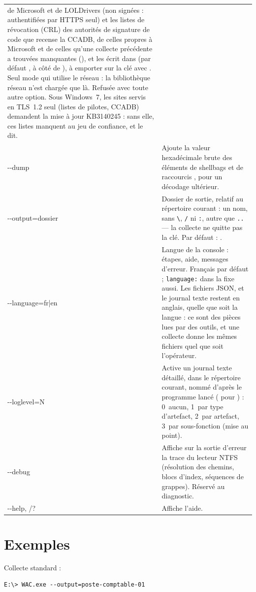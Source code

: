 \documentclass[11pt,a4paper,oneside]{report}
\begin{document}
\begin{longtable}{@{}>{\ttfamily}L{3.2cm}L{11.2cm}@{}}
  de Microsoft et de LOLDrivers (non signées : authentifiées par HTTPS seul)
  et les listes de révocation (CRL) des autorités de signature de code que
  recense la CCADB, de celles propres à Microsoft et de celles qu'une collecte
  précédente a trouvées manquantes (), et les écrit dans  (par
  défaut , à côté de ), à emporter sur la clé
  avec . Seul mode qui utilise le réseau : la bibliothèque
  réseau n'est chargée que là. Refusée avec toute autre option. Sous
  Windows~7, les sites servis en TLS~1.2 seul (listes de pilotes, CCADB)
  demandent la mise à jour KB3140245 : sans elle, ces listes manquent au jeu
  de confiance, et  le dit. \\
-{}-dump & Ajoute la valeur hexadécimale brute des éléments de shellbags et de
  raccourcis , pour un décodage ultérieur. \\
-{}-output=dossier & Dossier de sortie, relatif au répertoire courant : un nom,
  sans \texttt{\textbackslash}, \texttt{/} ni \texttt{:}, autre que
  \texttt{..} --- la collecte ne quitte pas la clé. Par défaut :
  . \\
-{}-language=fr|en & Langue de la console : étapes, aide, messages d'erreur.
  Français par défaut ; \texttt{language:} dans  la fixe
  aussi. Les fichiers JSON,  et le journal texte
  restent en anglais, quelle que soit la langue : ce sont des pièces lues par
  des outils, et une collecte donne les mêmes fichiers quel que soit
  l'opérateur. \\
-{}-loglevel=N & Active un journal texte détaillé, dans le répertoire courant,
  nommé d'après le programme lancé ( pour ) : 0~aucun, 1~par type
  d'artefact, 2~par artefact, 3~par sous-fonction (mise au point). \\
-{}-debug & Affiche sur la sortie d'erreur la trace du lecteur NTFS (résolution
  des chemins, blocs d'index, séquences de grappes). Réservé au diagnostic. \\
-{}-help, /? & Affiche l'aide. \\
\bottomrule
\end{longtable}

\section{Exemples}

Collecte standard :
\begin{lstlisting}
E:\> WAC.exe --output=poste-comptable-01
\end{lstlisting}
\end{document}

